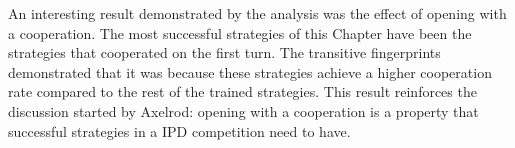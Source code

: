 An interesting result demonstrated by the analysis was the effect of opening
with a cooperation. The most successful strategies of this Chapter have been the
strategies that cooperated on the first turn. The transitive
fingerprints demonstrated that it was because these strategies achieve a higher
cooperation rate compared to the rest of the trained strategies. This result
reinforces the discussion started by Axelrod: opening with a cooperation is a
property that successful strategies in a IPD competition need to have.
